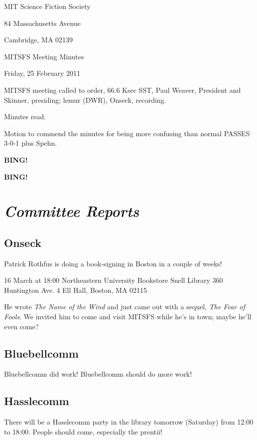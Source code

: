 \documentclass[10pt]{article}
\newcommand{\bing}{{\bf BING!} }
\newcommand{\goto}[1]{\bing \vskip 12pt \section*{{\em{#1}}}}
\newcommand{\ps}{ plus Spehn\xspace}
\newcommand{\skinner}{Paul Weaver, President and Skinner}
\newcommand{\onseck}{lemur (DWR), Onseck}
\newcommand{\meetingdate}{Friday, 25 February 2011}
\begin{document}
\begin{center}

MIT Science Fiction Society

84 Massachusetts Avenue

Cambridge, MA 02139

\vspace{12pt}

MITSFS Meeting Minutes

\meetingdate

\end{center}

\vspace{18pt}

\setlength{\parskip}{6pt}

\noindent
MITSFS meeting called to order, 66.6 Ksec SST,
\skinner, presiding; \onseck, recording.

Minutes read.  

Motion to commend the minutes for being more confusing than
normal PASSES 3-0-1\ps.

\bing

\goto{Committee Reports}

\subsection*{Onseck}

Patrick Rothfus is doing a book-signing in Boston in a couple of weeks!

16 March at 18:00
Northeastern University Bookstore
Snell Library
360 Huntington Ave.
4 Ell Hall, Boston, MA 02115

He wrote \emph{The Name of the Wind} and just came out with a sequel,
\emph{The Fear of Fools}.  We invited him to come and visit MITSFS
while he's in town; maybe he'll even come?

\subsection*{Bluebellcomm}

Bluebellcomm did work!  Bluebellcomm should do more work!

\subsection*{Hasslecomm}

There will be a Hasslecomm party in the library tomorrow (Saturday)
from 12:00 to 18:00.  People should come, especially the prentii!
\end{document}
